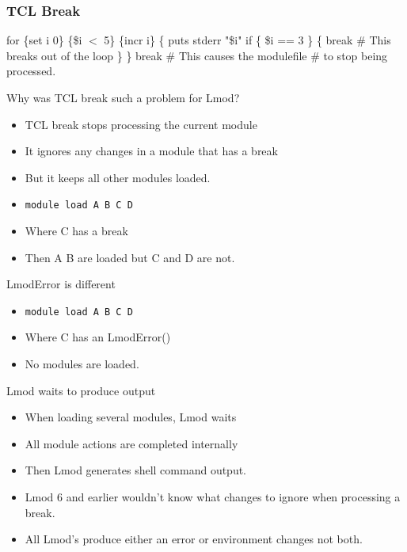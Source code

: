 \documentclass{beamer}
\begin{document}
\begin{frame}[fragile]
    \frametitle{TCL Break}
 {\small
   \begin{semiverbatim}
for \{set i 0\} \{\$i $<$ 5\} \{incr i\} \{
  puts stderr "\$i"
  if \{ \$i == 3 \} \{
      break  # This breaks out of the loop
  \}
\}
break # This causes the modulefile
      # to stop being processed.       
    \end{semiverbatim}
}
\end{frame}

\begin{frame}{Why was TCL break such a problem for Lmod?}
  \begin{itemize}
    \item TCL break stops processing the current module
    \item It ignores any changes in a module that has a break
    \item But it keeps all other modules loaded.
    \item {\color{blue} \texttt{module load A B C D}} 
    \item Where C has a break
    \item Then A B are loaded but C and D are not.
  \end{itemize}
\end{frame}

\begin{frame}{LmodError is different}
  \begin{itemize}
    \item {\color{blue} \texttt{module load A B C D}} 
    \item Where C has an LmodError()
    \item No modules are loaded.
  \end{itemize}
\end{frame}

\begin{frame}{Lmod waits to produce output}
  \begin{itemize}
    \item When loading several modules, Lmod waits
    \item All module actions are completed internally
    \item Then Lmod generates shell command output.
    \item Lmod 6 and earlier wouldn't know what changes to ignore when
      processing a break.
    \item All Lmod's produce either an error or environment changes
      not both.
  \end{itemize}
\end{frame}
\end{document}
